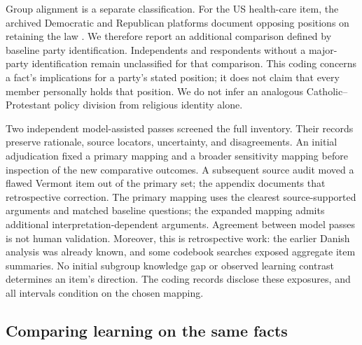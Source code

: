 Group alignment is a separate classification. For the US health-care item, the archived Democratic and Republican platforms document opposing positions on retaining the law \citep{democrats2016,republicans2016}. We therefore report an additional comparison defined by baseline party identification. Independents and respondents without a major-party identification remain unclassified for that comparison. This coding concerns a fact's implications for a party's stated position; it does not claim that every member personally holds that position. We do not infer an analogous Catholic--Protestant policy division from religious identity alone.

Two independent model-assisted passes screened the full inventory. Their records preserve rationale, source locators, uncertainty, and disagreements. An initial adjudication fixed a primary mapping and a broader sensitivity mapping before inspection of the new comparative outcomes. A subsequent source audit moved a flawed Vermont item out of the primary set; the appendix documents that retrospective correction. The primary mapping uses the clearest source-supported arguments and matched baseline questions; the expanded mapping admits additional interpretation-dependent arguments. Agreement between model passes is not human validation. Moreover, this is retrospective work: the earlier Danish analysis was already known, and some codebook searches exposed aggregate item summaries. No initial subgroup knowledge gap or observed learning contrast determines an item's direction. The coding records disclose these exposures, and all intervals condition on the chosen mapping.

\subsection{Comparing learning on the same facts}

